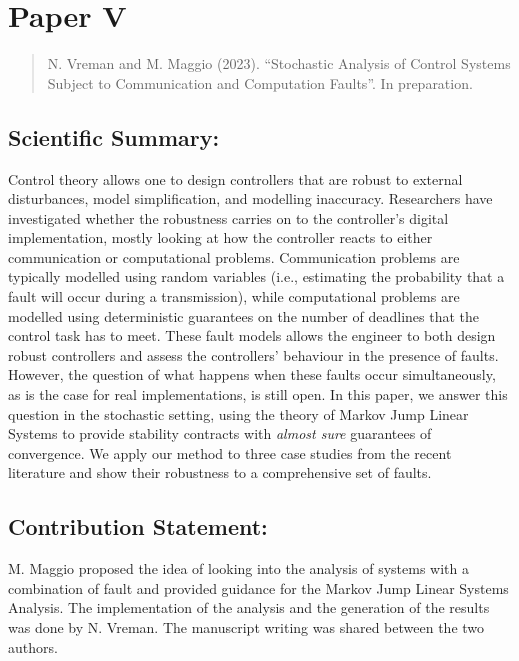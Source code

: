\documentclass{article}
\begin{document}
\section*{Paper V}%
%
\begin{quote}
N. Vreman and M. Maggio (2023). ``Stochastic Analysis of Control Systems Subject to Communication and Computation Faults''. In preparation.
\end{quote}

\subsection*{Scientific Summary:}%
%
Control theory allows one to design controllers that are robust to external disturbances, model simplification, and modelling inaccuracy.
Researchers have investigated whether the robustness carries on to the controller's digital implementation, mostly looking at how the controller reacts to either communication or computational problems.
Communication problems are typically modelled using random variables (i.e., estimating the probability that a fault will occur during a transmission), while computational problems are modelled using deterministic guarantees on the number of deadlines that the control task has to meet.
These fault models allows the engineer to both design robust controllers and assess the controllers' behaviour in the presence of faults.
However, the question of what happens when these faults occur simultaneously, as is the case for real implementations, is still open.
In this paper, we answer this question in the stochastic setting, using the theory of Markov Jump Linear Systems to provide stability contracts with \emph{almost sure} guarantees of convergence.
We apply our method to three case studies from the recent literature and show their robustness to a comprehensive set of faults.

\subsection*{Contribution Statement:}%
%
M. Maggio proposed the idea of looking into the analysis of systems with a combination of fault and provided guidance for the Markov Jump Linear Systems Analysis. The implementation of the analysis and the generation of the results was done by N. Vreman. The manuscript writing was shared between the two authors.
\end{document}
